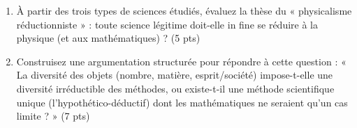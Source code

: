 \documentclass[11pt]{article}
\begin{document}
\begin{exercice}
\begin{enumerate}
    \item À partir des trois types de sciences étudiés, évaluez la thèse du « physicalisme réductionniste » : toute science légitime doit-elle in fine se réduire à la physique (et aux mathématiques) ? (5 pts)
    \item Construisez une argumentation structurée pour répondre à cette question : « La diversité des objets (nombre, matière, esprit/société) impose-t-elle une diversité irréductible des méthodes, ou existe-t-il une méthode scientifique unique (l'hypothético-déductif) dont les mathématiques ne seraient qu'un cas limite ? » (7 pts)
\end{enumerate}
\end{exercice}
\end{document}
